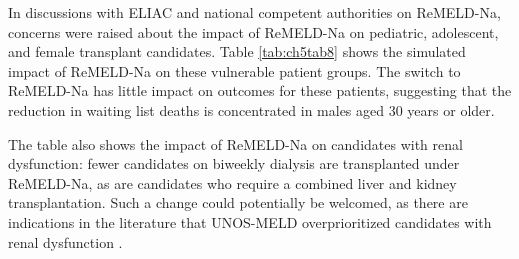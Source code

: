 \documentclass[11pt,twoside,]{book}
\begin{document}
\FloatBarrier

In discussions with ELIAC and national competent authorities on ReMELD-Na,
concerns were raised about the impact of ReMELD-Na on pediatric,
adolescent, and female transplant candidates. Table \ref{tab:ch5tab8}
shows the simulated impact of ReMELD-Na on these vulnerable patient groups. The switch
to ReMELD-Na has little impact on outcomes for these patients, suggesting that
the reduction in waiting list deaths is concentrated in males aged 30
years or older.

The table also shows the impact of ReMELD-Na on candidates with renal dysfunction:
fewer candidates on biweekly dialysis are transplanted under ReMELD-Na, as are
candidates who require a combined liver and kidney transplantation. Such a change
could potentially be welcomed, as there are indications in the literature that
UNOS-MELD overprioritized candidates with renal dysfunction \citep{sharmaReweightingModelEndStage2008}.
\end{document}
